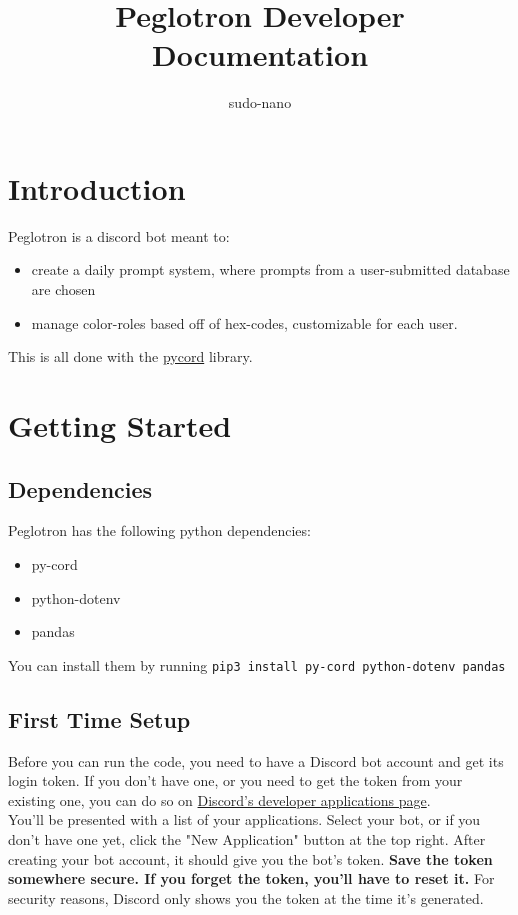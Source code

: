 \documentclass{article}
\title{Peglotron Developer Documentation}
\author{sudo-nano}
\begin{document}
\maketitle

\tableofcontents

\section{Introduction}
Peglotron is a discord bot meant to: 

\begin{itemize}
	\item create a daily prompt system, where prompts from a user-submitted database are chosen
	\item manage color-roles based off of hex-codes, customizable for each user. 
\end{itemize}

This is all done with the \href{https://guide.pycord.dev/}{pycord} library. 


\section{Getting Started}

\subsection{Dependencies}
Peglotron has the following python dependencies:
\begin{itemize}
	\item py-cord
	\item python-dotenv
	\item pandas
\end{itemize}

You can install them by running \verb|pip3 install py-cord python-dotenv pandas|

\subsection{First Time Setup}
Before you can run the code, you need to have a Discord bot account and get its login token. If you don't have one, or you need to get the token from your existing one, you can do so on \href{https://discord.com/developers/applications/me}{Discord's developer applications page}. \\

You'll be presented with a list of your applications. Select your bot, or if you don't have one yet, click the "New Application" button at the top right. After creating your bot account, it should give you the bot's token. \textbf{Save the token somewhere secure. If you forget the token, you'll have to reset it.} For security reasons, Discord only shows you the token at the time it's generated. \\
\end{document}
